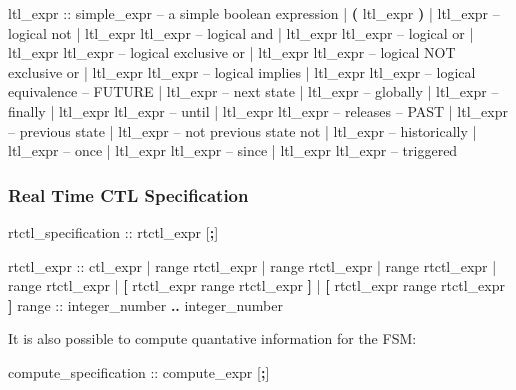 \begin{Grammar}
ltl_expr ::
    simple_expr              -- a simple boolean expression
    | \textbf{(} ltl_expr \textbf{)}
    | \operator{!} ltl_expr             -- logical not
    | ltl_expr \operator{\&} ltl_expr    -- logical and
    | ltl_expr \operator{|} ltl_expr    -- logical or
    | ltl_expr  ltl_expr  -- logical exclusive or
    | ltl_expr  ltl_expr -- logical NOT exclusive or
    | ltl_expr \operator{->} ltl_expr   -- logical implies
    | ltl_expr \operator{<->} ltl_expr  -- logical equivalence
    -- FUTURE
    |  ltl_expr             -- next state
    |  ltl_expr             -- globally
    |  ltl_expr             -- finally
    | ltl_expr  ltl_expr    -- until
    | ltl_expr  ltl_expr    -- releases
    -- PAST
    |  ltl_expr             -- previous state
    |  ltl_expr             -- not previous state not
    |  ltl_expr             -- historically
    |  ltl_expr             -- once 
    | ltl_expr  ltl_expr    -- since
    | ltl_expr  ltl_expr    -- triggered
\end{Grammar}


\subsubsection{Real Time CTL Specification}
\begin{Grammar}
rtctl_specification ::  rtctl_expr [\textbf{;}]
\end{Grammar}

\begin{Grammar}
rtctl_expr ::
        ctl_expr
      |  range rtctl_expr
      |  range rtctl_expr
      |  range rtctl_expr
      |  range rtctl_expr
      |  \textbf{[} rtctl_expr  range rtctl_expr \textbf{]}
      |  \textbf{[} rtctl_expr  range rtctl_expr \textbf{]}
range  :: integer_number \textbf{..} integer_number
\end{Grammar}

It is also possible to compute quantative information for the FSM:

\begin{Grammar}
compute_specification ::  compute_expr [\textbf{;}]
\end{Grammar}

